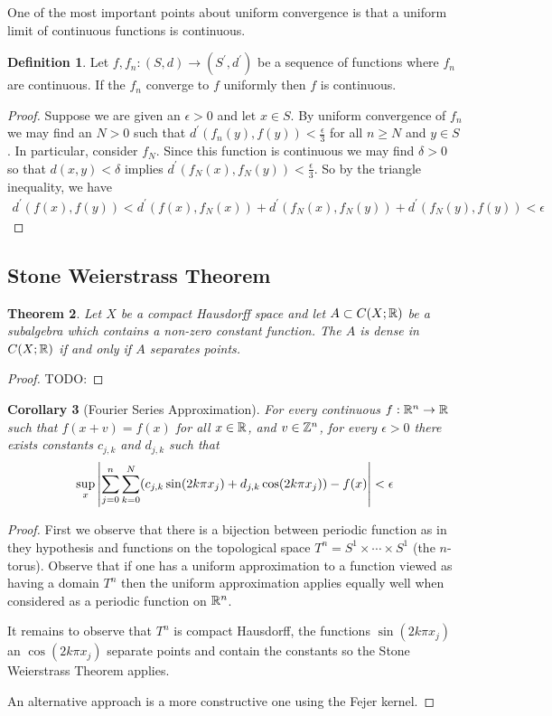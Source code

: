 \documentclass{amsart}
\newtheorem{thm}{Theorem}[section]
\newtheorem{cor}[thm]{Corollary}
\theoremstyle{remark}
\theoremstyle{definition}
\newtheorem{defn}[thm]{Definition}
\begin{document}
One of the most important points about uniform convergence is that a
uniform limit of continuous functions is continuous.
\begin{defn}\label{UniformLimitContinuousFunctionsIsContinuous}Let $f, f_n : (S,d) \to (S^\prime, d^\prime)$ be a sequence
  of functions where $f_n$ are continuous.  If the $f_n$ converge
  to $f$ uniformly then $f$ is continuous.
\end{defn}
\begin{proof}
Suppose we are given an $\epsilon > 0$ and let $x \in S$.  By uniform
convergence of $f_n$ we may find an $N > 0$ such that
$d^\prime(f_n(y), f(y)) < \frac{\epsilon}{3}$ for all $n \geq N$ and
$y \in S$.  In particular, consider $f_N$.  Since this function is
continuous we may find $\delta > 0$ so that $d(x,y) < \delta$ implies
$d^\prime(f_N(x), f_N(y)) < \frac{\epsilon}{3}$.  So by the triangle
inequality, we have 
\begin{align*}
d^\prime(f(x), f(y)) < d^\prime(f(x), f_N(x)) + d^\prime(f_N(x),
f_N(y)) + d^\prime(f_N(y), f(y)) < \epsilon
\end{align*}
\end{proof}

\subsection{Stone Weierstrass Theorem}

\begin{thm}Let $X$ be a compact Hausdorff space and let $A \subset
  C(X;\mathbb{R})$ be a subalgebra which contains a non-zero constant
  function.  The $A$ is dense in $C(X;\mathbb{R})$ if and only if $A$
  separates points.
\end{thm}
\begin{proof}TODO:
\end{proof}

\begin{cor}[Fourier Series Approximation]\label{FourierSeries}For
  every continuous $f : \mathbb{R}^n \to \mathbb{R}$ such that $f(x + v) =
  f(x)$ for all $x \in \mathbb{R}$, and $v \in \mathbb{Z}^n$, for every
$\epsilon > 0$  there exists constants $c_{j,k}$ and
$d_{j,k}$ such that 
\begin{align*}
\sup_x \left \vert \sum_{j=0}^n \sum_{k=0}^N (c_{j,k} \sin(2k\pi x_j) + d_{j,k}
\cos(2k\pi x_j)) - f(x) \right \vert < \epsilon
\end{align*}
\end{cor}
\begin{proof}First we observe that there is a bijection between
  periodic function as in they hypothesis and functions on the
  topological space $T^n = S^1 \times \cdots \times S^1$ (the $n$-torus).
Observe that if one has a uniform approximation to a function
viewed as having a domain $T^n$ then the uniform approximation applies
equally well when considered as a periodic function on $\mathbb{R}^n$.

It remains to observe that $T^n$ is compact Hausdorff, the functions $\sin(2k\pi x_j)$ an $\cos(2k
\pi x_j)$ separate points and contain the constants so the Stone Weierstrass
Theorem applies.

An alternative approach is a more constructive one using the Fejer kernel.
\end{proof}
\end{document}
